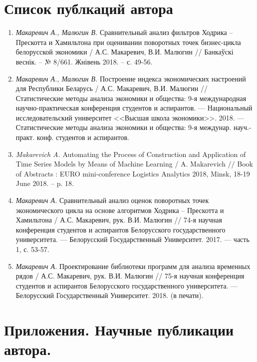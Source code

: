 \documentclass[a4paper,14pt]{extreport}
\begin{document}
	\chapter*{}
	\printbibliography[title=Список источников]
	
	\chapter*{Список публкаций автора}
	\begin{enumerate}[label=A\arabic*.]
		\item \textit{Макаревич А., Малюгин В.} Сравнительный анализ фильтров Ходрика -- Прескотта и Хамильтона при оценивании поворотных точек бизнес-цикла белорусской экономики / А.С. Макаревич, В.И. Малюгин // Банкаўскі веснік. -- № 8/661. Жнівень 2018. -- с. 49-56.
		
		\item \textit{Макаревич А., Малюгин В.} Построение индекса экономических настроений для Республики Беларусь / А.С. Макаревич, В.И. Малюгин // Статистические методы анализа экономики и общества: 9-я международная научно-практическая конференция студентов и аспирантов. — Национальный исследовательский университет <<Высшая школа экономики>>. 2018. — Статистические методы анализа экономики и общества: 9-я междунар. науч.-практ. конф. студентов и аспирантов.
		
		\item \textit{Makarevich A.} Automating the Process of Construction and Application of Time Series Models by Means of Machine Learning / A. Makarevich // Book of Abstracts : EURO mini-conference Logistics Analytics 2018, Minsk, 18-19 June 2018. -- p. 18.
		
		\item \textit{Макаревич А.} Сравнительный анализ оценок поворотных точек экономического цикла на основе алгоритмов Ходрика -- Прескотта и Хамильтона / А.С. Макаревич, рук. В.И. Малюгин // 74-я научная конференция студентов и аспирантов Белорусского государственного университета. — Белорусский Государственный Университет. 2017. — часть 1, с. 53-57.
		
		\item \textit{Макаревич А.} Проектирование библиотеки программ для анализа временных рядов / А.С. Макаревич, рук. В.И. Малюгин // 75-я научная конференция студентов и аспирантов Белорусского государственного университета. — Белорусский Государственный Университет. 2018. (в печати).
	\end{enumerate}
	
	
	\chapter*{Приложения. Научные публикации автора.}
	
\end{document}
